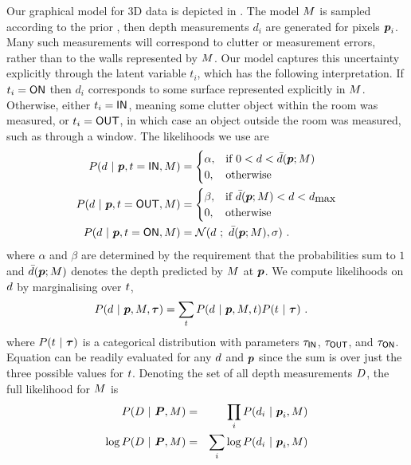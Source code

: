 Our graphical model for 3D data is depicted in . The
model $\Scene$ is sampled according to the prior ,
then depth measurements $d_i$ are generated for pixels
$\Pixel_i$. Many such measurements will correspond to clutter or
measurement errors, rather than to the walls represented by
$\Scene$. Our model captures this uncertainty explicitly through
the latent variable $t_i$, which has the following interpretation. If
$t_i=\ON$ then $d_i$ corresponds to some surface represented
explicitly in $\Scene$. Otherwise, either $t_i=\IN$, meaning some
clutter object within the room was measured, or $t_i=\OUT$, in which
case an object outside the room was measured, such as through a
window. The likelihoods we use are
\begin{align}
  \label{eq:x-inside}
  P(\Depth~|~\Pixel,\Ind=\textsf{IN},\Scene) &=
  \begin{cases}
    \alpha, & \mbox{if } 0 < \Depth < \DepthAtPGivenModel \\
    0, & \mbox{otherwise} \\
  \end{cases} \\
  \label{eq:x-outside}
  P(d~|~\Pixel,\Ind=\textsf{OUT},\Scene) &=
  \begin{cases}
    \beta, & \mbox{if } \DepthAtPGivenModel < \Depth < \Dmax \\
    0, & \mbox{otherwise} \\
  \end{cases} \\
  P(\Depth ~|~ \Pixel,\Ind=\textsf{ON},\Scene) &=
  \NormalDistr(\Depth~;~\DepthAtPGivenModel,\sigma) ~.
\end{align}
where $\alpha$ and $\beta$ are determined by the requirement that the
probabilities sum to $1$ and $\DepthAtPGivenModel$ denotes the depth
predicted by $\Scene$ at $\Pixel$. We compute likelihoods on $\Depth$ by
marginalising over $\Ind$,
\begin{align}
  \label{eq:3d-likelihood}
  P(\Depth~|~\Pixel,\Scene,\IndModel) &=
   \sum_{\Ind} P(\Depth~|~\Pixel,\Scene,\Ind) P(\Ind~|~\IndModel)
  ~.
\end{align}
where $P(\Ind~|~\IndModel)$ is a categorical distribution with
parameters $\tIN$, $\tOUT$, and $\tON$. Equation
 can be readily evaluated for any $\Depth$ and
$\Pixel$ since the sum is over just the three possible values for
$\Ind$. Denoting the set of all depth measurements $\Depths$, the full
likelihood for $\Scene$ is
\begin{eqnarray}
  \label{eq:depth-loglik}
  P(\Depths ~|~ \Pixels,\Scene) &=&
    \prod_i P(\Depth_i ~|~ \Pixel_i,\Scene)\\
  \log P(\Depths ~|~ \Pixels,\Scene) &=&
    \sum_i \log P(\Depth_i ~|~ \Pixel_i,\Scene)
\end{eqnarray}
